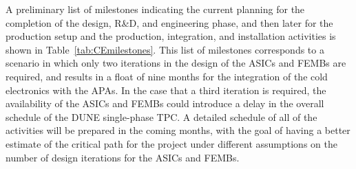 A preliminary list of milestones indicating the current planning for the completion
of the design, R\&D, and engineering phase, and then later for the production setup
and the production, integration, and installation activities is shown in Table~\ref{tab:CEmilestones}.
This list of milestones corresponds to a scenario in which only two iterations in
the design of the ASICs and FEMBs are required, and results in a float of nine months
for the integration of the cold electronics with the APAs. In the case that a third
iteration is required, the availability of the ASICs and FEMBs could introduce a 
delay in the overall schedule of the DUNE single-phase TPC. 
A detailed schedule of all of the activities will be prepared in the coming months,
with the goal of having a better estimate of the critical path for the project
under different assumptions on the number of design iterations for the ASICs and FEMBs.

